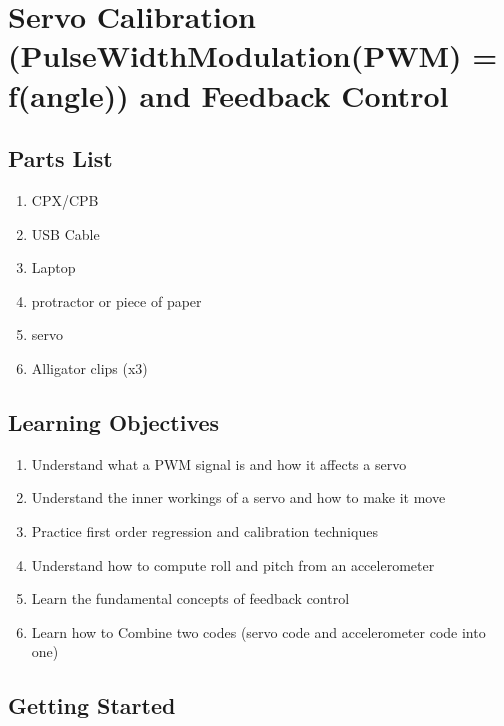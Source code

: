 \newpage

\section{Servo Calibration (PulseWidthModulation(PWM) =
  f(angle)) and Feedback Control}
\label{s:pwm}

\subsection{Parts List}

\begin{enumerate}[itemsep=-5pt]
\item CPX/CPB
\item USB Cable
\item Laptop
\item protractor or piece of paper
\item servo
\item Alligator clips (x3)
\end{enumerate}

\subsection{Learning Objectives}
\begin{enumerate}[itemsep=-5pt]
\item Understand what a PWM signal is and how it affects a servo
\item Understand the inner workings of a servo and how to make it move
\item Practice first order regression and calibration techniques
\item Understand how to compute roll and pitch from an accelerometer
\item Learn the fundamental concepts of feedback control
\item Learn how to Combine two codes (servo code and accelerometer code into one)
\end{enumerate}

\subsection{Getting Started}

